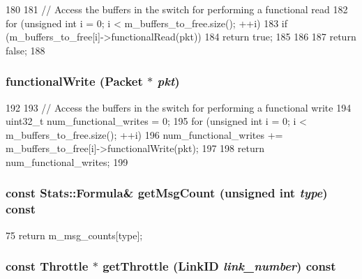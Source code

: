 \begin{DoxyCode}
180 {
181     // Access the buffers in the switch for performing a functional read
182     for (unsigned int i = 0; i < m_buffers_to_free.size(); ++i) {
183         if (m_buffers_to_free[i]->functionalRead(pkt)) {
184             return true;
185         }
186     }
187     return false;
188 }
\end{DoxyCode}
\hypertarget{classSwitch_aba9037f662122b5f2e85647d35670e5c}{
\subsubsection[{functionalWrite}]{ functionalWrite ({\bf Packet} $\ast$ {\em pkt})}}
\label{classSwitch_aba9037f662122b5f2e85647d35670e5c}



\begin{DoxyCode}
192 {
193     // Access the buffers in the switch for performing a functional write
194     uint32_t num_functional_writes = 0;
195     for (unsigned int i = 0; i < m_buffers_to_free.size(); ++i) {
196         num_functional_writes += m_buffers_to_free[i]->functionalWrite(pkt);
197     }
198     return num_functional_writes;
199 }
\end{DoxyCode}
\hypertarget{classSwitch_a0dc269718320917d8da80fe3d5275d90}{
\subsubsection[{getMsgCount}]{\setlength{\rightskip}{0pt plus 5cm}const {\bf Stats::Formula}\& getMsgCount (unsigned int {\em type}) const}}
\label{classSwitch_a0dc269718320917d8da80fe3d5275d90}



\begin{DoxyCode}
75     { return m_msg_counts[type]; }
\end{DoxyCode}
\hypertarget{classSwitch_afd8e00a7915149693164e75dfa80a2b2}{
\subsubsection[{getThrottle}]{\setlength{\rightskip}{0pt plus 5cm}const {\bf Throttle} $\ast$ getThrottle ({\bf LinkID} {\em link\_\-number}) const}}
\label{classSwitch_afd8e00a7915149693164e75dfa80a2b2}



